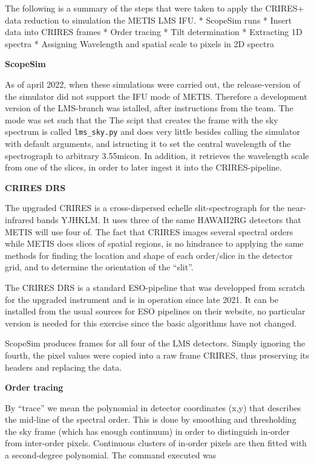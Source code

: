     
    The following is a summary of the steps that were taken to apply the
CRIRES+ data reduction to simulation the METIS LMS IFU. * ScopeSim runs
* Insert data into CRIRES frames * Order tracing * Tilt determination *
Extracting 1D spectra * Assigning Wavelength and spatial scale to pixels
in 2D spectra

    \textbf{ScopeSim}

As of april 2022, when these simulations were carried out, the
release-version of the simulator did not support the IFU mode of METIS.
Therefore a development version of the LMS-branch was istalled, after
instructions from the team. The mode was set such that the The scipt
that creates the frame with the sky spectrum is called
\texttt{lms\_sky.py} and does very little besides calling the simulator
with default arguments, and istructing it to set the central wavelength
of the spectrograph to arbitrary 3.55micon. In addition, it retrieves
the wavelength scale from one of the slices, in order to later ingest it
into the CRIRES-pipeline.

    \textbf{CRIRES DRS}

The upgraded CRIRES is a cross-dispersed echelle slit-spectrograph for
the near-infrared bands YJHKLM. It uses three of the same HAWAII2RG
detectors that METIS will use four of. The fact that CRIRES images
several spectral orders while METIS does slices of spatial regions, is
no hindrance to applying the same methods for finding the location and
shape of each order/slice in the detector grid, and to determine the
orientation of the ``slit''.

The CRIRES DRS is a standard ESO-pipeline that was developped from
scratch for the upgraded instrument and is in operation since late 2021.
It can be installed from the usual sources for ESO pipelines on their
website, no particular version is needed for this exercise since the
basic algorithms have not changed.

ScopeSim produces frames for all four of the LMS detectors. Simply
ignoring the fourth, the pixel values were copied into a raw frame
CRIRES, thus preserving its headers and replacing the data.

    \textbf{Order tracing}

By ``trace'' we mean the polynomial in detector coordinates (x,y) that
describes the mid-line of the spectral order. This is done by smoothing
and thresholding the sky frame (which has enough continuum) in order to
distinguish in-order from inter-order pixels. Continuous clusters of
in-order pixels are then fitted with a second-degree polynomial. The
command executed was

